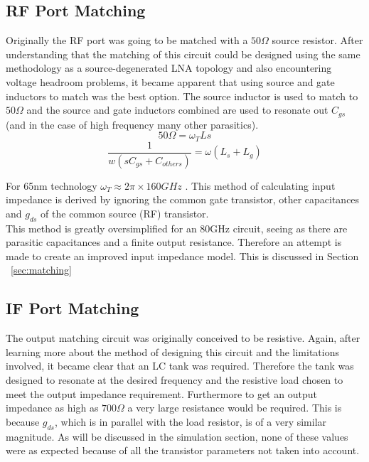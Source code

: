 \documentclass{article}                                                         %
\begin{document}
\subsection{RF Port Matching}
Originally the RF port was going to be matched with a $50 \Omega $ source resistor. After understanding that the
matching of this circuit could be designed using the same methodology as a source-degenerated LNA topology and also encountering
voltage headroom problems, it became apparent that using source and gate inductors to match was the best option. The source inductor is
used to match to $50\Omega$ and the source and gate inductors combined are used to resonate out $C_{gs}$ (and in the case of high frequency
many other parasitics).
\begin{equation}
  \label{eq:InputRes}
  50 \Omega = \omega_TLs
\end{equation}
\begin{equation}
  \label{eq:GateInd}
  \dfrac{1}{w(sC_{gs}+C_{others})} = \omega(L_s+L_g)
\end{equation}

\vspace{3mm}For 65nm technology $\omega_T \approx 2\pi \times 160GHz$ \cite{Razavi:2011:RM:2132691}.
This method of calculating input impedance is derived by ignoring the common gate transistor,
other capacitances and $g_{ds}$ of the common source (RF) transistor. \\

This method is greatly oversimplified for an 80GHz circuit, seeing as there are parasitic capacitances and a finite output resistance.
Therefore an attempt is made to create an improved input impedance model. This is discussed in Section ~\ref{sec:matching}

\subsection{IF Port Matching}
The output matching circuit was originally conceived to be resistive. Again, after learning more about the method of designing this circuit and
the limitations involved, it became clear that an LC tank was required. Therefore the tank was designed to resonate at the desired frequency and the resistive
load chosen to meet the output impedance requirement. Furthermore to get an output impedance as high as $700\Omega$ a very large resistance would be required. This
is because $g_{ds}$, which is in parallel with the load resistor, is of a very similar magnitude.  As will be discussed in the simulation section, none of these values were as expected
because of all the transistor parameters not taken into account.
\end{document}
